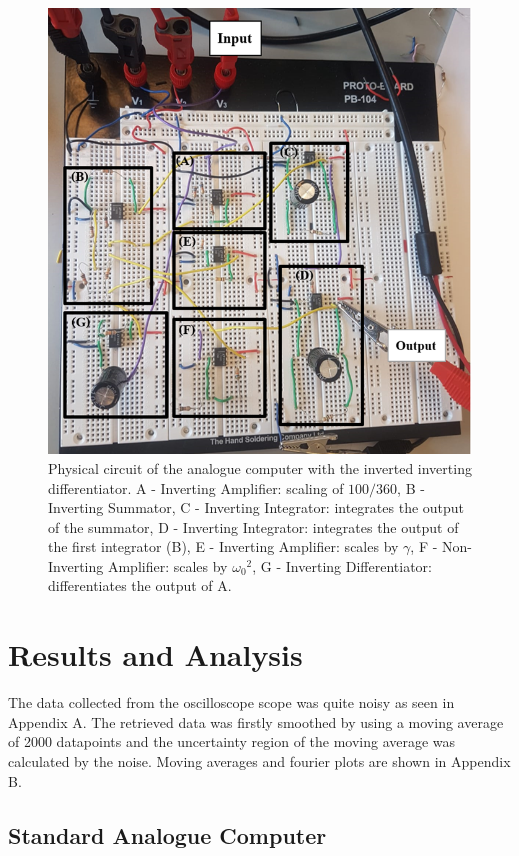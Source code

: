 \documentclass[journal]{Imperial_lab_report}
\begin{document}
\begin{figure}[h]
    \centering

    \includegraphics[scale = 0.3]{circuit.png}
    \caption{Physical circuit of the analogue computer with the inverted inverting differentiator. A - Inverting Amplifier: scaling of $100/360$, B - Inverting Summator, C - Inverting Integrator: integrates the output of the summator, D - Inverting Integrator: integrates the output of the first integrator (B), E - Inverting Amplifier: scales by $\gamma$, F - Non-Inverting Amplifier: scales by ${\omega_0}^2$, G - Inverting Differentiator: differentiates the output of A.}
\end{figure}

    \section{Results and Analysis}

    The data collected from the oscilloscope scope was quite noisy as seen in Appendix A. The retrieved data was firstly smoothed by using a moving average of 2000 datapoints and the uncertainty region of the moving average was calculated by the noise. Moving averages and fourier plots are shown in Appendix B.

    \subsection{Standard Analogue Computer}
\end{document}

